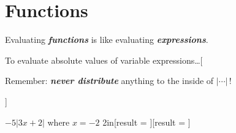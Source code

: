 \needspace{2in}
\section{Functions}

\begin{tcolorbox}[center,width=5in,]
    \centering
    Evaluating {\bfseries\itshape functions} is like evaluating {\bfseries\itshape expressions}. 
\end{tcolorbox}


\begin{myConceptSteps}{To evaluate absolute values of variable expressions\dots}[
    \begin{tcolorbox}[center,width=5in,colback=white,]
        \centering
        Remember: {\bfseries\itshape never distribute} anything to the inside of $|\cdots|$\,!
    \end{tcolorbox}
]
\end{myConceptSteps}

{
    $-5|3x+2|$ \quad where $x=-2$ %
}{2in}[{\raggedleft result = }][{\raggedleft result = }]
